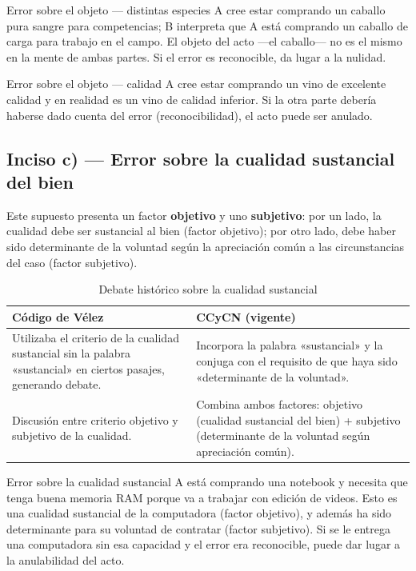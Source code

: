 \documentclass[12pt,oneside]{book}
\begin{document}
\begin{example}{Error sobre el objeto --- distintas especies}
A cree estar comprando un caballo pura sangre para competencias; B interpreta que A está comprando un caballo de carga para trabajo en el campo. El objeto del acto ---el caballo--- no es el mismo en la mente de ambas partes. Si el error es reconocible, da lugar a la nulidad.
\end{example}

\begin{example}{Error sobre el objeto --- calidad}
A cree estar comprando un vino de excelente calidad y en realidad es un vino de calidad inferior. Si la otra parte debería haberse dado cuenta del error (reconocibilidad), el acto puede ser anulado.
\end{example}

\subsection{Inciso c) --- Error sobre la cualidad sustancial del bien}

Este supuesto presenta un factor \textbf{objetivo} y uno \textbf{subjetivo}: por un lado, la cualidad debe ser sustancial al bien (factor objetivo); por otro lado, debe haber sido determinante de la voluntad según la apreciación común a las circunstancias del caso (factor subjetivo).

\begin{table}[H]
\centering
\begin{tabularx}{\textwidth}{>{\raggedright\arraybackslash}X >{\raggedright\arraybackslash}X}
\toprule
\textbf{Código de Vélez} & \textbf{CCyCN (vigente)} \\
\midrule
Utilizaba el criterio de la cualidad sustancial sin la palabra «sustancial» en ciertos pasajes, generando debate. & Incorpora la palabra «sustancial» y la conjuga con el requisito de que haya sido «determinante de la voluntad». \\[4pt]
Discusión entre criterio objetivo y subjetivo de la cualidad. & Combina ambos factores: objetivo (cualidad sustancial del bien) + subjetivo (determinante de la voluntad según apreciación común). \\
\bottomrule
\end{tabularx}
\caption{Debate histórico sobre la cualidad sustancial}
\end{table}

\begin{example}{Error sobre la cualidad sustancial}
A está comprando una notebook y necesita que tenga buena memoria RAM porque va a trabajar con edición de videos. Esto es una cualidad sustancial de la computadora (factor objetivo), y además ha sido determinante para su voluntad de contratar (factor subjetivo). Si se le entrega una computadora sin esa capacidad y el error era reconocible, puede dar lugar a la anulabilidad del acto.
\end{example}
\end{document}

